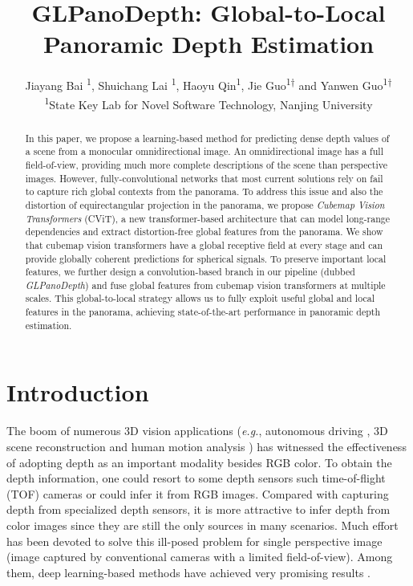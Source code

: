 \documentclass[10pt,twocolumn,letterpaper]{article}
\begin{document}
\title{GLPanoDepth: Global-to-Local Panoramic Depth Estimation}




\author{Jiayang Bai \textsuperscript{\rm 1}, Shuichang Lai \textsuperscript{\rm 1}, Haoyu Qin\textsuperscript{\rm 1}, Jie Guo\textsuperscript{\rm 1}\textsuperscript{$\dagger$} and Yanwen Guo\textsuperscript{\rm 1}\textsuperscript{$\dagger$}\\
\textsuperscript{\rm 1}State Key Lab for Novel Software Technology, Nanjing University
}


\maketitle

\begin{abstract}
In this paper, we propose a learning-based method for predicting dense depth values of a scene from a monocular omnidirectional image. An omnidirectional image has a full field-of-view, providing much more complete descriptions of the scene than perspective images. However, fully-convolutional networks that most current solutions rely on fail to capture rich global contexts from the panorama. To address this issue and also the distortion of equirectangular projection in the panorama, we propose \emph{Cubemap Vision Transformers} (CViT), a new transformer-based architecture that can model long-range dependencies and extract distortion-free global features from the panorama. We show that cubemap vision transformers have a global receptive field at every stage and can provide globally coherent predictions for spherical signals. To preserve important local features, we further design a convolution-based branch in our pipeline (dubbed \emph{GLPanoDepth}) and fuse global features from cubemap vision transformers at multiple scales. This global-to-local strategy allows us to fully exploit useful global and local features in the panorama, achieving state-of-the-art performance in panoramic depth estimation.
\end{abstract}

\section{Introduction}
The boom of numerous 3D vision applications (\emph{e.g.}, autonomous driving \cite{8025618,8100178,9197319}, 3D scene reconstruction \cite{https://doi.org/10.1111/cgf.13386,https://doi.org/10.1111/cgf.14021} and human motion analysis \cite{CHEN20131995}) has witnessed the effectiveness of adopting depth as an important modality besides RGB color. To obtain the depth information, one could resort to some depth sensors such time-of-flight (TOF) cameras or could infer it from RGB images. Compared with capturing depth from specialized depth sensors, it is more attractive to infer depth from color images since they are still the only sources in many scenarios. Much effort has been devoted to solve this ill-posed problem for single perspective image (image captured by conventional cameras with a limited field-of-view). Among them, deep learning-based methods have achieved very promising results \cite{DBLP:journals/corr/abs-1906-06113,s20082272,MING202114}. 
\end{document}

